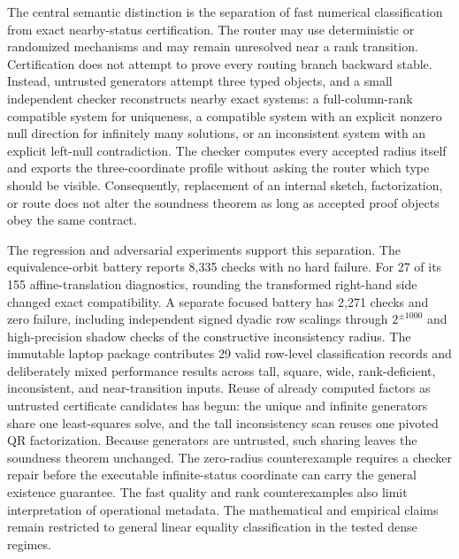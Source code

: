 \documentclass[11pt]{article}
\theoremstyle{definition}
\begin{document}
The central semantic distinction is the separation of fast numerical classification from exact nearby-status certification. The router may use deterministic or randomized mechanisms and may remain unresolved near a rank transition. Certification does not attempt to prove every routing branch backward stable. Instead, untrusted generators attempt three typed objects, and a small independent checker reconstructs nearby exact systems: a full-column-rank compatible system for uniqueness, a compatible system with an explicit nonzero null direction for infinitely many solutions, or an inconsistent system with an explicit left-null contradiction. The checker computes every accepted radius itself and exports the three-coordinate profile without asking the router which type should be visible. Consequently, replacement of an internal sketch, factorization, or route does not alter the soundness theorem as long as accepted proof objects obey the same contract.

The regression and adversarial experiments support this separation. The equivalence-orbit battery reports 8,335 checks with no hard failure. For 27 of its 155 affine-translation diagnostics, rounding the transformed right-hand side changed exact compatibility. A separate focused battery has 2,271 checks and zero failure, including independent signed dyadic row scalings through $2^{\pm1000}$ and high-precision shadow checks of the constructive inconsistency radius. The immutable laptop package contributes 29 valid row-level classification records and deliberately mixed performance results across tall, square, wide, rank-deficient, inconsistent, and near-transition inputs. Reuse of already computed factors as untrusted certificate candidates has begun: the unique and infinite generators share one least-squares solve, and the tall inconsistency scan reuses one pivoted QR factorization. Because generators are untrusted, such sharing leaves the soundness theorem unchanged. The zero-radius counterexample requires a checker repair before the executable infinite-status coordinate can carry the general existence guarantee. The fast quality and rank counterexamples also limit interpretation of operational metadata. The mathematical and empirical claims remain restricted to general linear equality classification in the tested dense regimes.

\appendix
\end{document}
